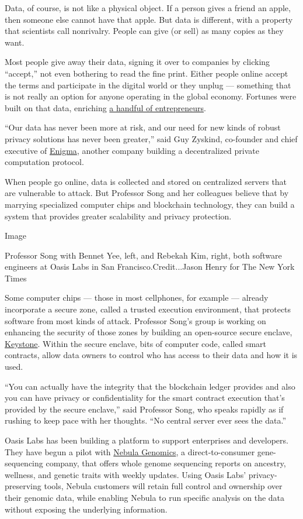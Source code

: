 Data, of course, is not like a physical object. If a person gives a
friend an apple, then someone else cannot have that apple. But data is
different, with a property that scientists call nonrivalry. People can
give (or sell) as many copies as they want.

Most people give away their data, signing it over to companies by
clicking ``accept,'' not even bothering to read the fine print. Either
people online accept the terms and participate in the digital world or
they unplug --- something that is not really an option for anyone
operating in the global economy. Fortunes were built on that data,
enriching \href{https://www.entrepreneur.com/article/319952}{a handful
of entrepreneurs}.

``Our data has never been more at risk, and our need for new kinds of
robust privacy solutions has never been greater,'' said Guy Zyskind,
co-founder and chief executive of \href{https://enigma.co/}{Enigma},
another company building a decentralized private computation protocol.

When people go online, data is collected and stored on centralized
servers that are vulnerable to attack. But Professor Song and her
colleagues believe that by marrying specialized computer chips and
blockchain technology, they can build a system that provides greater
scalability and privacy protection.

Image

Professor Song with Bennet Yee, left, and Rebekah Kim, right, both
software engineers at Oasis Labs in San Francisco.Credit...Jason Henry
for The New York Times

Some computer chips --- those in most cellphones, for example ---
already incorporate a secure zone, called a trusted execution
environment, that protects software from most kinds of attack. Professor
Song's group is working on enhancing the security of those zones by
building an open-source secure enclave,
\href{https://keystone-enclave.org/}{Keystone}. Within the secure
enclave, bits of computer code, called smart contracts, allow data
owners to control who has access to their data and how it is used.

``You can actually have the integrity that the blockchain ledger
provides and also you can have privacy or confidentiality for the smart
contract execution that's provided by the secure enclave,'' said
Professor Song, who speaks rapidly as if rushing to keep pace with her
thoughts. ``No central server ever sees the data.''

Oasis Labs has been building a platform to support enterprises and
developers. They have begun a pilot with
\href{https://nebula.org/}{Nebula Genomics}, a direct-to-consumer
gene-sequencing company, that offers whole genome sequencing reports on
ancestry, wellness, and genetic traits with weekly updates. Using Oasis
Labs' privacy-preserving tools, Nebula customers will retain full
control and ownership over their genomic data, while enabling Nebula to
run specific analysis on the data without exposing the underlying
information.

